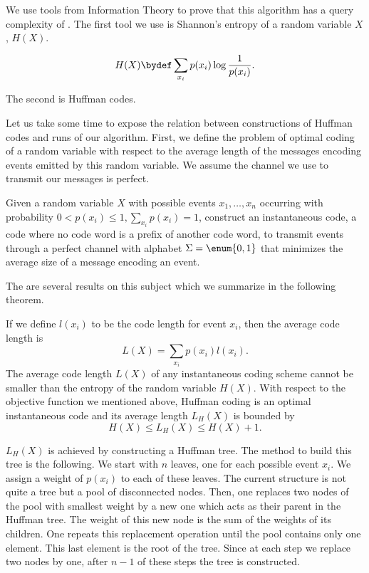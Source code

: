We use tools from Information Theory to prove that this algorithm has
a query complexity of \BigO{\ITLB}. The first tool we use is Shannon's entropy of a random
variable \(X\), \(H(X)\).
\begin{definition}
\begin{displaymath}
H(X) \bydef \sum_{x_i} p(x_i) \log \frac{1}{p(x_i)}.
\end{displaymath}
\end{definition}
The second is Huffman codes.

Let us take some time to expose the relation between constructions of Huffman
codes and runs of our algorithm. First, we define the problem of optimal
coding of a random variable with respect to the average length of the messages
encoding events emitted by this random variable. We assume the channel we
use to transmit our messages is perfect.
\begin{problem}
Given a random variable \(X\) with possible events \(x_1,\ldots,x_n\) occurring
with probability \(0 < p(x_i) \le 1, \sum_{x_i} p(x_i) = 1\), construct an
instantaneous code, \ie a code where no code word is a prefix of another code
word, to transmit events through a perfect channel with alphabet
\(\Sigma = \enum{0,1}\) that minimizes the average size of a message encoding
an event.
\end{problem}

The are several results on this subject which we summarize in the
following theorem.
\begin{theorem}
If we define \(l(x_i)\) to be the code
length for event \(x_i\), then the average code length is
\begin{displaymath}
L(X) = \sum_{x_i} p(x_i) l(x_i).
\end{displaymath}
The average code length \(L(X)\) of any instantaneous coding scheme cannot be smaller than
the entropy of the random variable \(H(X)\).
With respect to the objective function we mentioned above, Huffman coding is
an optimal instantaneous code and its average length \(L_H(X)\) is bounded by
\begin{displaymath}
H(X) \le L_H(X) \le H(X) + 1.
\end{displaymath}
\end{theorem}

\(L_H(X)\) is achieved by constructing a Huffman tree. The method to build this
tree is the following. We start with \(n\) leaves, one for each possible event
\(x_i\). We assign a weight of \(p(x_i)\) to each of these leaves. The current
structure is not quite a tree but a pool of disconnected nodes. Then, one
replaces two nodes of the pool with smallest weight by a new one which
acts as their parent in the Huffman tree. The weight of this new node is
the sum of the weights of its children. One repeats this
replacement operation until the pool contains only one element. This last
element is the root of the tree. Since at each step we replace two nodes by
one, after \(n-1\) of these steps the tree is constructed.

